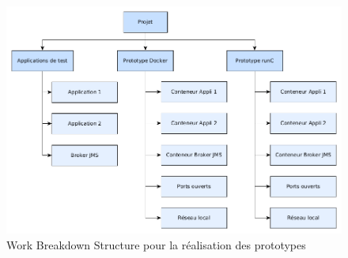     \begin{figure}[H]
            \centering
            \includegraphics[width=\textwidth]{images/WBS.png}
            \caption{Work Breakdown Structure pour la réalisation des prototypes}
            \label{fig:wbs}
    \end{figure}
